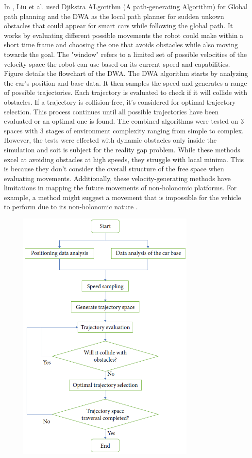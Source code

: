 In \cite{R19}, Liu et al. used Djikstra ALgorithm (A path-generating Algorithm) 
for Global path planning and 
the DWA as the local path planner for sudden unkown obstacles that could 
appear for smart cars while following the global path.
It works by evaluating different possible movements the robot could make within a short time frame 
and choosing the one that avoids obstacles while also moving towards the goal. The "window" refers 
to a limited set of possible velocities of the velocity space the robot can use based on its current 
speed and capabilities. Figure  details the flowchart of the DWA. 
The DWA algorithm starts by analyzing the car's position and base data. It then samples the speed and 
generates a range of possible trajectories. Each trajectory is evaluated to check if it will collide with 
obstacles. If a trajectory is collision-free, it's considered for optimal trajectory selection. This process 
continues until all possible trajectories have been evaluated or an optimal one is found.
The combined algorithms were tested on 3 spaces with 3 stages of environment complexity ranging from 
simple to complex. However, the tests were effected with dynamic obstacles only inside the simulation and
soit is subject for the reality gap problem.
While these methods excel at avoiding obstacles at high speeds, they struggle with local minima. This is 
because they don't consider the overall structure of the free space when evaluating movements.
Additionally, these velocity-generating methods have limitations in mapping the future movements of 
non-holonomic platforms. For example, a method might suggest a movement that is impossible for the 
vehicle to perform due to its non-holonomic nature \cite{R28}.

\begin{figure}[H] 
\centering  
\includegraphics[width=3.5in]{images/Chap1/DWA_flowchart.png}  
\label{flowchart of the DWA}  
\end{figure}


